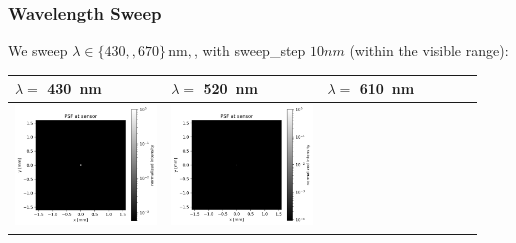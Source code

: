 \documentclass[11pt,a4paper]{article}
\begin{document}
	\subsubsection*{Wavelength Sweep}\label{wavelength-sweep}
	
	We sweep \(\lambda \in \{430,, 670\}\,\mathrm{nm}, \), with sweep\_step  \(10 nm\) (within the visible range):
	
	\begin{table}[H]
		\centering
		\begin{tabular}{>{\centering\arraybackslash}m{0.31\linewidth} >{\centering\arraybackslash}m{0.31\linewidth} >{\centering\arraybackslash}m{0.31\linewidth}}
			\toprule
			\(\lambda=\) \SI{430}{nm} & \(\lambda=\) \SI{520}{nm} & \(\lambda=\) \SI{610}{nm} \\
			\midrule
			\includegraphics[width=\linewidth,keepaspectratio]{sweep_lambda/biconvex_psf_430_log.png} &
			\includegraphics[width=\linewidth,keepaspectratio]{sweep_lambda/biconvex_psf_520_log.png} &

\end{tabular}
\end{table}
\end{document}
